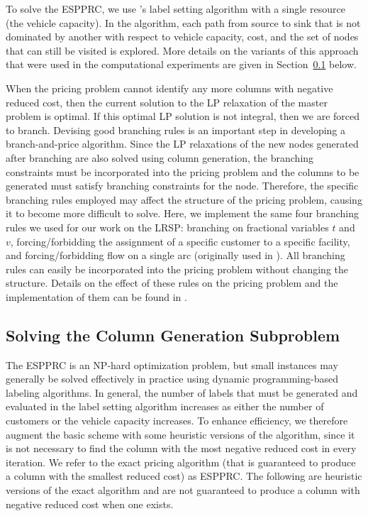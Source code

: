 To solve the ESPPRC, we use \citet{Feillet}'s label setting algorithm
with a single resource (the vehicle capacity). In the algorithm, each
path from source to sink that is not dominated by another with respect
to vehicle capacity, cost, and the set of nodes that can still be
visited is explored. More details on the variants of this approach
that were used in the computational experiments are given in
Section~\ref{sec:pricing} below.

When the pricing problem cannot identify any more columns with
negative reduced cost, then the current solution to the LP relaxation
of the master problem is optimal. If this optimal LP solution is not
integral, then we are forced to branch. Devising good branching rules
is an important step in developing a branch-and-price algorithm. Since
the LP relaxations of the new nodes generated after branching are also
solved using column generation, the branching constraints must be
incorporated into the pricing problem and the columns to be generated
must satisfy branching constraints for the node. Therefore, the
specific branching rules employed may affect the structure of the
pricing problem, causing it to become more difficult to solve. Here,
we implement the same four branching rules we used for our work on the
LRSP: branching on fractional variables $t$ and $v$, forcing/forbidding the
assignment of a specific customer to a specific facility, and
forcing/forbidding flow on a single arc (originally used in
\citet{Desrochers4}). All branching rules
can easily be incorporated into the pricing problem without
changing the structure. Details on the effect of these rules on the
pricing problem and the implementation of them can be found in
\citet{Akca}.

\subsection{Solving the Column Generation Subproblem}
\label{sec:pricing}
The ESPPRC is an NP-hard optimization problem, but small
instances may generally be solved effectively in practice using
dynamic programming-based labeling algorithms. In general, the number
of labels that must be generated and evaluated in the label setting
algorithm increases as either the number of customers or the vehicle
capacity increases. To enhance efficiency, we therefore augment the
basic scheme with some heuristic versions of the algorithm, since it
is not necessary to find the column with the most negative reduced
cost in every iteration. We refer to the exact pricing algorithm (that is
guaranteed to produce a column with the smallest reduced cost) as ESPPRC.
The following are heuristic versions of the exact algorithm and are
not guaranteed to produce a column with negative reduced cost when one
exists.

